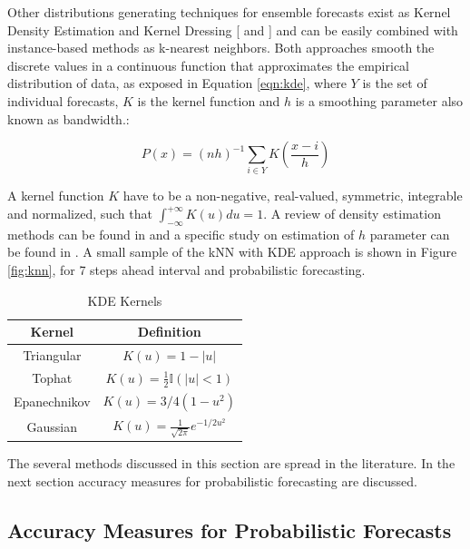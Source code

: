 
Other distributions generating techniques for ensemble forecasts exist as Kernel Density Estimation \citep{Hong2016a} and Kernel Dressing [ \citep{Pinson2009} and \citep{Brocker2008}] and can be easily combined with instance-based methods as k-nearest neighbors. Both approaches smooth the discrete values in a continuous function that approximates the empirical distribution of data, as exposed in Equation \eqref{eqn:kde}, where $Y$ is the set of individual forecasts, $K$ is the kernel function and $h$ is a smoothing parameter also known as bandwidth.:

\begin{equation}
P(x) = (nh)^{-1} \sum_{i \in Y} K\left(\frac{x - i}{h}\right)
\label{eqn:kde}
\end{equation}

A kernel function $K$ have to be a non-negative, real-valued, symmetric, integrable and normalized, such that $\int_{-\infty}^{+\infty}K(u) du = 1$. A review of density estimation methods can be found in \cite{Silverman1986} and a specific study on estimation of $h$ parameter can be found in \cite{Sheather1991}. A small sample of the kNN with KDE approach is shown in Figure \ref{fig:knn}, for 7 steps ahead interval and probabilistic forecasting. 

\begin{table}[]
    \centering
    \begin{tabular}{|c|c|} \hline
        \textbf{Kernel} & \textbf{Definition} \\ \hline
        Triangular & $K(u) = 1 - |u|$ \\ \hline
        Tophat & $K(u) = \frac{1}{2}\mathbb{I}(|u| < 1)$ \\ \hline
        Epanechnikov & $K(u) = 3/4(1-u^2)$ \\ \hline
        Gaussian & $K(u) = \frac{1}{\sqrt{2\pi}}e^{-1/2u^2}$ \\  \hline
    \end{tabular}
    \caption{KDE Kernels}
    \label{tab:kde_kernels}
\end{table}

The several methods discussed in this section are spread in the literature. In the next section accuracy measures for probabilistic forecasting are discussed.

%
\subsection{Accuracy Measures for Probabilistic Forecasts}
\label{sec:prob_probabilistic_measure}

